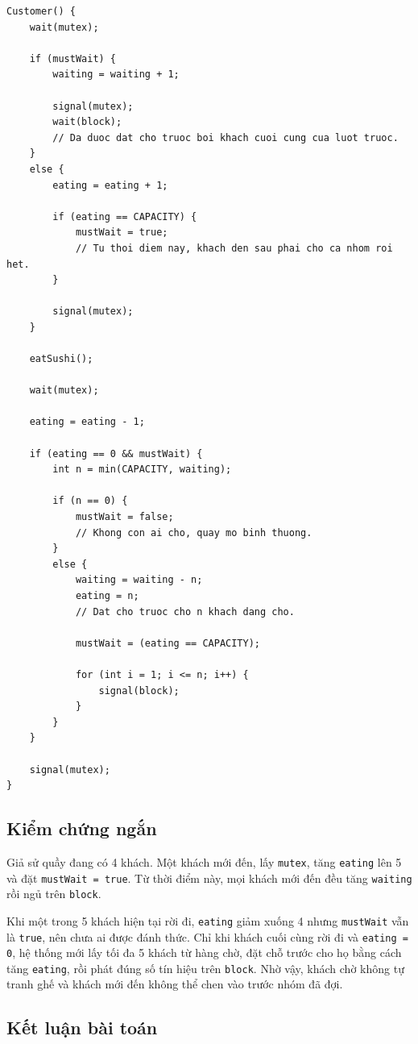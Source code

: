 \begin{lstlisting}
Customer() {
    wait(mutex);

    if (mustWait) {
        waiting = waiting + 1;

        signal(mutex);
        wait(block);
        // Da duoc dat cho truoc boi khach cuoi cung cua luot truoc.
    }
    else {
        eating = eating + 1;

        if (eating == CAPACITY) {
            mustWait = true;
            // Tu thoi diem nay, khach den sau phai cho ca nhom roi het.
        }

        signal(mutex);
    }

    eatSushi();

    wait(mutex);

    eating = eating - 1;

    if (eating == 0 && mustWait) {
        int n = min(CAPACITY, waiting);

        if (n == 0) {
            mustWait = false;
            // Khong con ai cho, quay mo binh thuong.
        }
        else {
            waiting = waiting - n;
            eating = n;
            // Dat cho truoc cho n khach dang cho.

            mustWait = (eating == CAPACITY);

            for (int i = 1; i <= n; i++) {
                signal(block);
            }
        }
    }

    signal(mutex);
}
\end{lstlisting}

\subsection{Kiểm chứng ngắn}

Giả sử quầy đang có 4 khách. Một khách mới đến, lấy \texttt{mutex}, tăng
\texttt{eating} lên 5 và đặt \texttt{mustWait = true}. Từ thời điểm này, mọi
khách mới đến đều tăng \texttt{waiting} rồi ngủ trên \texttt{block}.

Khi một trong 5 khách hiện tại rời đi, \texttt{eating} giảm xuống 4 nhưng
\texttt{mustWait} vẫn là \texttt{true}, nên chưa ai được đánh thức. Chỉ khi
khách cuối cùng rời đi và \texttt{eating = 0}, hệ thống mới lấy tối đa 5 khách
từ hàng chờ, đặt chỗ trước cho họ bằng cách tăng \texttt{eating}, rồi phát đúng
số tín hiệu trên \texttt{block}. Nhờ vậy, khách chờ không tự tranh ghế và
khách mới đến không thể chen vào trước nhóm đã đợi.

\subsection{Kết luận bài toán}

